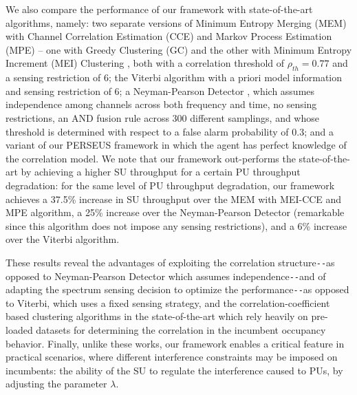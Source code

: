 \documentclass[10pt,twocolumn]{IEEEtran}
\begin{document}
We also compare the performance of our framework with state-of-the-art algorithms, namely: two separate versions of Minimum Entropy Merging (MEM) with Channel Correlation Estimation (CCE) and Markov Process Estimation (MPE) -- one with Greedy Clustering (GC) and the other with Minimum Entropy Increment (MEI) Clustering \cite{6956794}, both with a correlation threshold of $\rho_{th}{=}0.77$ and a sensing restriction of $6$; the Viterbi algorithm \cite{4554696} with a priori model information and sensing restriction of $6$; a Neyman-Pearson Detector \cite{5167826}, which assumes independence among channels across both frequency and time, no sensing restrictions, an AND fusion rule across 300 different samplings, and whose threshold is determined with respect to a false alarm probability of $0.3$; and a variant of our PERSEUS framework in which the agent has perfect knowledge of the correlation model. We note that our framework out-performs the state-of-the-art by achieving a higher SU throughput for a certain PU throughput degradation: for the same level of PU throughput degradation, our framework achieves a 37.5\% increase in SU throughput over the MEM with MEI-CCE and MPE algorithm, a 25\% increase over the Neyman-Pearson Detector (remarkable since this algorithm does not impose any sensing restrictions), and a 6\% increase over the Viterbi algorithm. 

These results reveal the advantages of exploiting the correlation structure\texttt{-{}-}as opposed to Neyman-Pearson Detector which assumes independence\texttt{-{}-}and of adapting the spectrum sensing decision to optimize the performance\texttt{-{}-}as opposed to Viterbi, which uses a fixed sensing strategy, and the correlation-coefficient based clustering algorithms in the state-of-the-art which rely heavily on pre-loaded datasets for determining the correlation in the incumbent occupancy behavior. Finally, unlike these works, our framework enables a critical feature in practical scenarios, where different interference constraints may be imposed on incumbents: the ability of the SU to regulate the interference caused to PUs, by adjusting the parameter $\lambda$.
\end{document}
